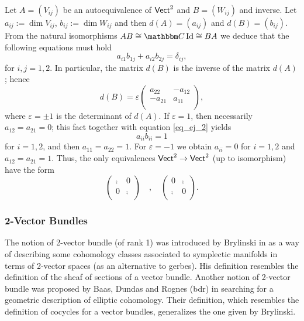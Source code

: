 \begin{ej}
Let $A=(V_{ij})$ be an autoequivalence of $\mathsf{Vect}^2$ and $B=(W_{ij})$ and inverse. Let $a_{ij}:=\dim V_{ij}$, $b_{ij}:=\dim W_{ij}$ and then $d(A)=(a_{ij})$ and $d(B)=(b_{ij})$. From the natural isomorphisms $AB\cong \comp \opnm{Id}\cong BA$ we deduce that the following equations must hold
\begin{equation}\label{eq_ej_2}
a_{i1}b_{1j}+a_{i2}b_{2j}=\delta_{ij},
\end{equation}
for $i,j=1,2$. In particular, the matrix $d(B)$ is the inverse of the matrix $d(A)$; hence
$$d(B)=\varepsilon \begin{pmatrix}
a_{22} & -a_{12} \\
-a_{21} & a_{11} \\
\end{pmatrix},
$$
where $\varepsilon =\pm 1$ is the determinant of $d(A)$. If $\varepsilon =1$, then necessarily $a_{12}=a_{21}=0$; this fact together with equation \eqref{eq_ej_2} yields
$$a_{ii}b_{ii}=1$$
for $i=1,2$, and then $a_{11}=a_{22}=1$. For $\varepsilon =-1$ we obtain $a_{ii}=0$ for $i=1,2$ and $a_{12}=a_{21}=1$. Thus, the only equivalences $\mathsf{Vect}^2\to \mathsf{Vect}^2$ (up to isomorphism) have the form
$$\begin{pmatrix}
\comp & 0 \\
0 & \comp \\
\end{pmatrix}\quad , \quad
\begin{pmatrix}
0 & \comp \\
\comp & 0 \\
\end{pmatrix}.
$$
\end{ej}



\subsubsection{2-Vector Bundles}

The notion of 2-vector bundle (of rank 1) was introduced by Brylinski in \cite{brylinski:_catvb} as a way of describing some cohomology classes associated to symplectic manifolds in terms of 2-vector spaces (as an alternative to gerbes). His definition resembles the definition of the sheaf of sections of a vector bundle. Another notion of 2-vector bundle was proposed by Baas, Dundas and Rognes ({\sc bdr}) in \cite{bdr:_2vb} searching for a geometric description of elliptic cohomology. Their definition, which resembles the definition of cocycles for a vector bundles, generalizes the one given by Brylinski.


